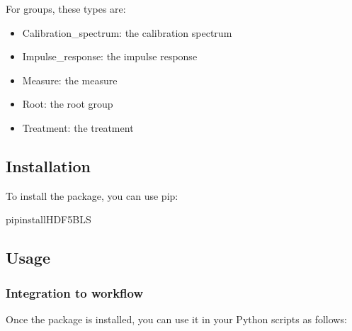\documentclass[letterpaper,10pt,english]{sphinxmanual}
\begin{document}
\sphinxAtStartPar
For groups, these types are:
\begin{itemize}
\item {} 
\sphinxAtStartPar
Calibration\_spectrum: the calibration spectrum

\item {} 
\sphinxAtStartPar
Impulse\_response: the impulse response

\item {} 
\sphinxAtStartPar
Measure: the measure

\item {} 
\sphinxAtStartPar
Root: the root group

\item {} 
\sphinxAtStartPar
Treatment: the treatment

\end{itemize}


\subsection{Installation}
\label{\detokenize{source/quickstart:installation}}
\sphinxAtStartPar
To install the package, you can use pip:

\begin{sphinxVerbatim}[commandchars=\\\{\}]
pipinstallHDF5\PYGZus{}BLS
\end{sphinxVerbatim}


\subsection{Usage}
\label{\detokenize{source/quickstart:usage}}

\subsubsection{Integration to workflow}
\label{\detokenize{source/quickstart:integration-to-workflow}}
\sphinxAtStartPar
Once the package is installed, you can use it in your Python scripts as follows:
\end{document}
